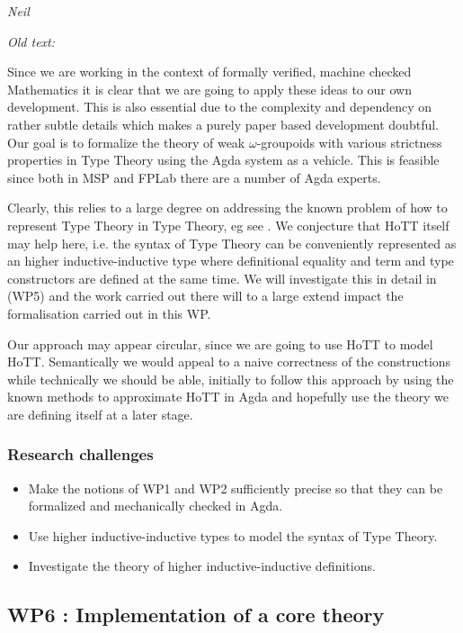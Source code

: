 \documentclass[twocolumn,a4paper,11pt]{article}
\begin{document}
\emph{Neil}

\emph{Old text:}

Since we are working in the context of formally verified, machine
checked Mathematics it is clear that we are going to apply these ideas
to our own development. This is also essential due to the complexity
and dependency on rather subtle details which makes a purely paper
based development doubtful. Our goal is to formalize the theory of
weak $\omega$-groupoids with various strictness properties in Type
Theory using the Agda system as a vehicle. This is feasible since both
in MSP and FPLab there are a number of Agda experts. 

Clearly, this relies to a large degree on addressing the known problem
of how to represent Type Theory in Type Theory, eg see
\cite{Chapman:tteat}.  We conjecture that HoTT itself may help here,
i.e. the syntax of Type Theory can be conveniently represented as an
higher inductive-inductive type where definitional equality and term
and type constructors are defined at the same time. We will
investigate this in detail in (WP5) and the work carried out there
will to a large extend impact the formalisation carried out in this
WP.


Our approach may appear circular, since we are going to use HoTT to
model HoTT. Semantically we would appeal to a naive correctness of the
constructions while technically we should be able, initially to follow
this approach by using the known methods to approximate HoTT in Agda
\cite{LicatasTrick}  and hopefully use the theory we are defining
itself at a later stage. 

\subsubsection*{Research challenges}

\begin{itemize}
\item Make the notions of WP1 and WP2 sufficiently precise so that they
  can be formalized and mechanically checked in Agda.

\item Use higher inductive-inductive types to model the syntax of Type
  Theory. 

\item Investigate the theory of higher inductive-inductive
  definitions.

\end{itemize}

\subsection*{WP6 : Implementation of a core theory} 
\end{document}
